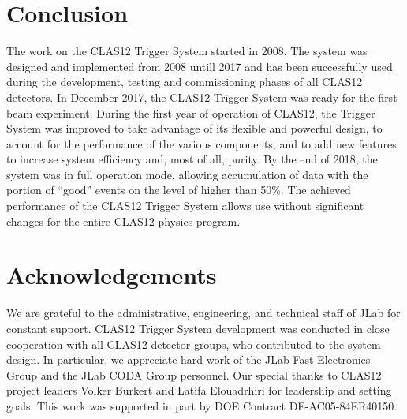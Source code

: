 \section{Conclusion}

The work on the CLAS12 Trigger System started in 2008. The system was designed and implemented from 2008 untill 2017 and has been successfully used during the development, testing and commissioning phases of all CLAS12 detectors. In December 2017, the CLAS12 Trigger System was ready for the first beam experiment. During the first year of operation of CLAS12, the Trigger System was improved to take advantage of its flexible and powerful design, to account for the performance of the various components, and to add new features to increase system efficiency and, most of all, purity. By the end of 2018, the system was in full operation mode, allowing accumulation of data with the portion of ``good'' events on the level of higher than 50$\%$. The achieved performance of the CLAS12 Trigger System allows use without significant changes for the entire CLAS12 physics program.

\section{Acknowledgements}

We are grateful to the administrative, engineering, and technical staff of JLab for constant support. CLAS12 Trigger System development was conducted in close cooperation with all CLAS12 detector groups, who contributed to the system design. In particular, we appreciate hard work of the JLab Fast Electronics Group and the JLab CODA Group personnel. Our special thanks to CLAS12 project leaders Volker Burkert and Latifa Elouadrhiri for leadership and setting goals. This work was supported in part by DOE Contract DE-AC05-84ER40150.

